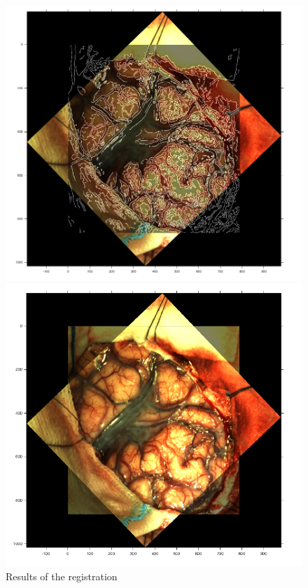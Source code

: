 \documentclass[a4paper,16pt]{article}
\begin{document}
\begin{enumerate}
\begin{figure}[H]
	\centering
	\begin{minipage}[b]{0.45\linewidth}
        \includegraphics[width=\linewidth]{registrationEdges.png}
	\end{minipage}
	\begin{minipage}[b]{0.45\linewidth}
        \includegraphics[width=\linewidth]{registrationImgs.png}
	\end{minipage}	
	\caption{Results of the registration}
\end{figure}

\end{enumerate}
\end{document}
